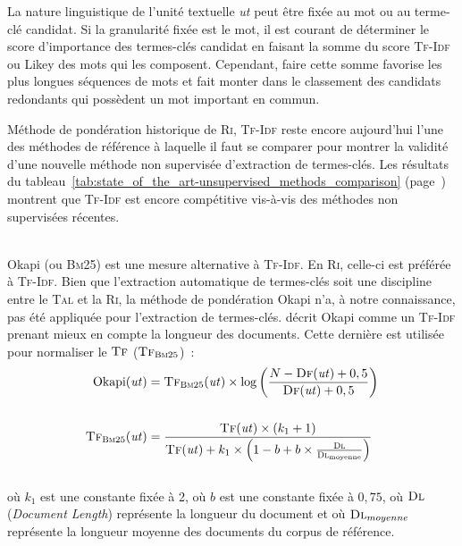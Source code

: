         La nature linguistique de l'unité textuelle \textit{ut} peut être fixée au mot ou au
        terme-clé candidat. Si la granularité fixée est le mot, il est courant
        de déterminer le score d'importance des termes-clés candidat en faisant
        la somme du score \textsc{Tf-Idf} ou Likey des mots qui les composent.
        Cependant, faire cette somme favorise les plus longues séquences de mots
        et fait monter dans le classement des candidats redondants qui possèdent
        un mot important en commun.

        Méthode de pondération historique de \textsc{Ri}, \textsc{Tf-Idf} reste
        encore aujourd'hui l'une des méthodes de référence à laquelle il faut se
        comparer pour montrer la validité d'une nouvelle méthode non supervisée
        d'extraction de termes-clés. Les résultats du
        tableau~\ref{tab:state_of_the_art-unsupervised_methods_comparison}
        (page~\pageref{tab:state_of_the_art-unsupervised_methods_comparison})
        montrent que \textsc{Tf-Idf} est encore compétitive vis-à-vis des
        méthodes non supervisées récentes.

        ~\\Okapi (ou \textsc{Bm}25) \cite{robertson1999okapi} est une mesure
        alternative à \textsc{Tf-Idf}. En \textsc{Ri},
        celle-ci est préférée à \textsc{Tf-Idf}. Bien que l'extraction
        automatique de termes-clés soit une discipline entre le
        \textsc{Tal} et la \textsc{Ri}, la méthode de pondération Okapi n'a, à
        notre connaissance, pas été appliquée pour l'extraction de termes-clés.
         décrit Okapi comme un \textsc{Tf-Idf}
        prenant mieux en compte la longueur des documents. Cette dernière est
        utilisée pour normaliser le $\textsc{Tf}$
        ($\textsc{Tf}_{\textsc{Bm}25}$)~:
        \begin{align}
          \text{Okapi}(\text{\textit{ut}}) &= \textsc{Tf}_{\textsc{Bm}25}(\text{\textit{ut}}) \times \log\left(\frac{N - \textsc{Df}(\text{\textit{ut}}) + 0,5}{\textsc{Df}(\text{\textit{ut}}) + 0,5}\right) \label{math:okapi}\\
          \notag\\
          \textsc{Tf}_{\textsc{Bm}25}(\text{\textit{ut}}) &= \frac{\textsc{Tf}(\text{\textit{ut}}) \times (k_1 + 1)}{\textsc{Tf}(\text{\textit{ut}}) + k_1 \times \left(1 - b + b \times \frac{\textsc{Dl}}{\textsc{Dl}_{\text{moyenne}}}\right)} \label{math:tf_bm25}
        \end{align}\\
        où $k_1$ est une constante fixée à 2, où $b$ est une constante fixée à
        $0,75$, où $\textsc{Dl}$ (\textit{Document Length}) représente la
        longueur du document et où $\textsc{Dl}_{moyenne}$ représente la
        longueur moyenne des documents du corpus de référence.

